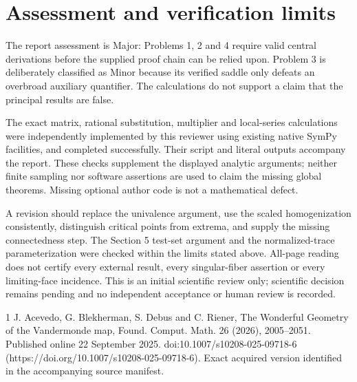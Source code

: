 \documentclass[10pt]{article}
\begin{document}
\section*{Assessment and verification limits}
The report assessment is Major: Problems 1, 2 and 4 require valid central derivations before the supplied proof chain can be relied upon. Problem 3 is deliberately classified as Minor because its verified saddle only defeats an overbroad auxiliary quantifier. The calculations do not support a claim that the principal results are false.\par
The exact matrix, rational substitution, multiplier and local-series calculations were independently implemented by this reviewer using existing native SymPy facilities, and completed successfully. Their script and literal outputs accompany the report. These checks supplement the displayed analytic arguments; neither finite sampling nor software assertions are used to claim the missing global theorems. Missing optional author code is not a mathematical defect.\par
A revision should replace the univalence argument, use the scaled homogenization consistently, distinguish critical points from extrema, and supply the missing connectedness step. The Section 5 test-set argument and the normalized-trace parameterization were checked within the limits stated above. All-page reading does not certify every external result, every singular-fiber assertion or every limiting-face incidence. This is an initial scientific review only; scientific decision remains pending and no independent acceptance or human review is recorded.\par
1 J. Acevedo, G. Blekherman, S. Debus and C. Riener, The Wonderful Geometry of the Vandermonde map, Found. Comput. Math. 26 (2026), 2005–2051. Published online 22 September 2025. doi:10.1007/s10208-025-09718-6 (https://doi.org/10.1007/s10208-025-09718-6). Exact acquired version identified in the accompanying source manifest.\par
\end{document}
